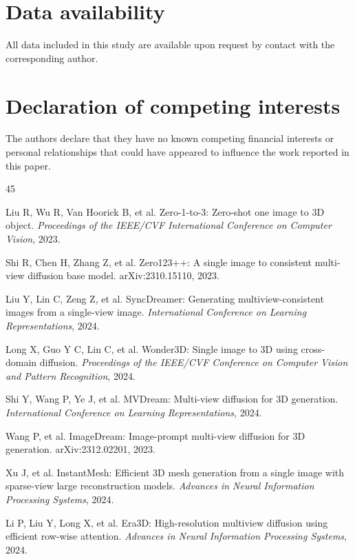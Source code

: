 \documentclass[times,twocolumn,final]{elsarticle}
\begin{document}
\section*{Data availability}

All data included in this study are available upon request by contact with the corresponding author.

\section*{Declaration of competing interests}

The authors declare that they have no known competing financial interests or personal relationships that could have appeared to influence the work reported in this paper.


\begin{thebibliography}{45}


Liu R, Wu R, Van Hoorick B, et al. Zero-1-to-3: Zero-shot one image to 3D object. \textit{Proceedings of the IEEE/CVF International Conference on Computer Vision}, 2023.

Shi R, Chen H, Zhang Z, et al. Zero123++: A single image to consistent multi-view diffusion base model. arXiv:2310.15110, 2023.

Liu Y, Lin C, Zeng Z, et al. SyncDreamer: Generating multiview-consistent images from a single-view image. \textit{International Conference on Learning Representations}, 2024.

Long X, Guo Y C, Lin C, et al. Wonder3D: Single image to 3D using cross-domain diffusion. \textit{Proceedings of the IEEE/CVF Conference on Computer Vision and Pattern Recognition}, 2024.

Shi Y, Wang P, Ye J, et al. MVDream: Multi-view diffusion for 3D generation. \textit{International Conference on Learning Representations}, 2024.

Wang P, et al. ImageDream: Image-prompt multi-view diffusion for 3D generation. arXiv:2312.02201, 2023.

Xu J, et al. InstantMesh: Efficient 3D mesh generation from a single image with sparse-view large reconstruction models. \textit{Advances in Neural Information Processing Systems}, 2024.

Li P, Liu Y, Long X, et al. Era3D: High-resolution multiview diffusion using efficient row-wise attention. \textit{Advances in Neural Information Processing Systems}, 2024.


\end{thebibliography}
\end{document}
